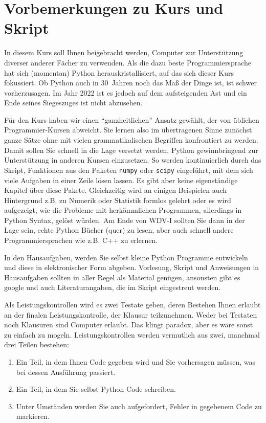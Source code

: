 \chapter{Vorbemerkungen zu Kurs und Skript}

In diesem Kurs soll Ihnen beigebracht werden, Computer zur Unterstützung diverser anderer Fächer zu verwenden.
%
Als die dazu beste Programmiersprache hat sich (momentan) Python herauskristallisiert, auf das sich dieser Kurs fokussiert. 
%
Ob Python auch in 30~Jahren noch das Ma{\ss} der Dinge ist, ist schwer vorherzusagen.
%
Im Jahr 2022 ist es jedoch auf dem aufsteigenden Ast und ein Ende seines Siegeszuges ist nicht abzusehen.

Für den Kurs haben wir einen ``ganzheitlichen'' Ansatz gewählt, der von üblichen Programmier-Kursen abweicht.
%
Sie lernen also im übertragenen Sinne zunächst ganze Sätze ohne mit vielen grammatikalischen Begriffen konfrontiert zu werden. 
%
Damit sollen Sie schnell in die Lage versetzt werden, Python gewinnbringend zur Unterstützung in anderen Kursen einzusetzen. 
%
So werden kontinuierlich durch das Skript, Funktionen aus den Paketen \texttt{numpy} oder \texttt{scipy} eingeführt, mit dem sich viele Aufgaben in einer Zeile lösen lassen.
%
Es gibt aber keine eigenständige Kapitel über diese Pakete. 
%
Gleichzeitig wird an einigen Beispielen auch Hintergrund z.B. zu Numerik oder Statistik formlos gelehrt oder es wird aufgezeigt, wie die Probleme mit herkömmlichen Programmen, allerdings in Python Syntax, gelöst würden.
%
Am Ende von WDV-I sollten Sie dann in der Lage sein, echte Python Bücher (quer) zu lesen, aber auch schnell andere Programmiersprachen wie z.B. C++ zu erlernen. 

In den Hausaufgaben, werden Sie selbst kleine Python Programme entwickeln und diese in elektronischer Form abgeben.
%
Vorlesung, Skript und Anweisungen in Hausaufgaben sollten in aller Regel als Material genügen, ansonsten gibt es google und auch Literaturangaben, die im Skript eingestreut werden.

Als Leistungskontrollen wird es zwei Testate geben, deren Bestehen Ihnen erlaubt an der finalen Leistungskontrolle, der Klausur teilzunehmen.
%
Weder bei Testaten noch Klausuren sind Computer erlaubt.
%
Das klingt paradox, aber es wäre sonst zu einfach zu mogeln.
%
Leistungskontrollen werden vermutlich aus zwei, manchmal drei Teilen bestehen:
\begin{enumerate}
\item Ein Teil, in dem Ihnen Code gegeben wird und Sie vorhersagen müssen, was bei dessen Ausführung passiert.
\item Ein Teil, in dem Sie selbst Python Code schreiben. 
\item Unter Umständen werden Sie auch aufgefordert, Fehler in gegebenem Code zu markieren. 
\end{enumerate}

